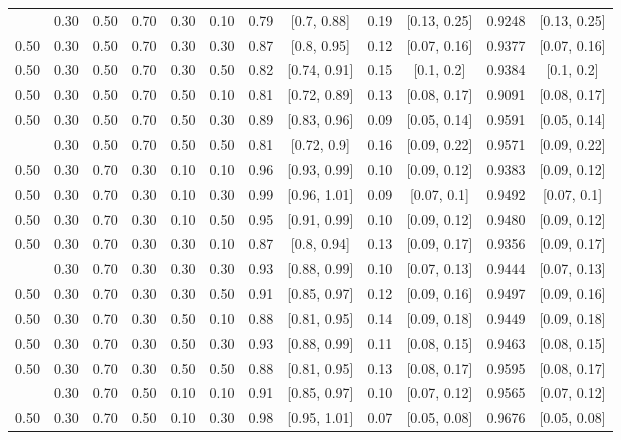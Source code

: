 \documentclass[
  11pt,
]{article}
\begin{document}
\begin{landscape}
\begin{ThreePartTable}
\begin{longtable}[t]{cccccccccccc}
\addlinespace
0.50 & 0.30 & 0.50 & 0.70 & 0.30 & 0.10 & 0.79 & {}[0.7, 0.88] & 0.19 & {}[0.13, 0.25] & 0.9248 & {}[0.13, 0.25]\\
0.50 & 0.30 & 0.50 & 0.70 & 0.30 & 0.30 & 0.87 & {}[0.8, 0.95] & 0.12 & {}[0.07, 0.16] & 0.9377 & {}[0.07, 0.16]\\
0.50 & 0.30 & 0.50 & 0.70 & 0.30 & 0.50 & 0.82 & {}[0.74, 0.91] & 0.15 & {}[0.1, 0.2] & 0.9384 & {}[0.1, 0.2]\\
0.50 & 0.30 & 0.50 & 0.70 & 0.50 & 0.10 & 0.81 & {}[0.72, 0.89] & 0.13 & {}[0.08, 0.17] & 0.9091 & {}[0.08, 0.17]\\
0.50 & 0.30 & 0.50 & 0.70 & 0.50 & 0.30 & 0.89 & {}[0.83, 0.96] & 0.09 & {}[0.05, 0.14] & 0.9591 & {}[0.05, 0.14]\\
\addlinespace
0.50 & 0.30 & 0.50 & 0.70 & 0.50 & 0.50 & 0.81 & {}[0.72, 0.9] & 0.16 & {}[0.09, 0.22] & 0.9571 & {}[0.09, 0.22]\\
0.50 & 0.30 & 0.70 & 0.30 & 0.10 & 0.10 & 0.96 & {}[0.93, 0.99] & 0.10 & {}[0.09, 0.12] & 0.9383 & {}[0.09, 0.12]\\
0.50 & 0.30 & 0.70 & 0.30 & 0.10 & 0.30 & 0.99 & {}[0.96, 1.01] & 0.09 & {}[0.07, 0.1] & 0.9492 & {}[0.07, 0.1]\\
0.50 & 0.30 & 0.70 & 0.30 & 0.10 & 0.50 & 0.95 & {}[0.91, 0.99] & 0.10 & {}[0.09, 0.12] & 0.9480 & {}[0.09, 0.12]\\
0.50 & 0.30 & 0.70 & 0.30 & 0.30 & 0.10 & 0.87 & {}[0.8, 0.94] & 0.13 & {}[0.09, 0.17] & 0.9356 & {}[0.09, 0.17]\\
\addlinespace
0.50 & 0.30 & 0.70 & 0.30 & 0.30 & 0.30 & 0.93 & {}[0.88, 0.99] & 0.10 & {}[0.07, 0.13] & 0.9444 & {}[0.07, 0.13]\\
0.50 & 0.30 & 0.70 & 0.30 & 0.30 & 0.50 & 0.91 & {}[0.85, 0.97] & 0.12 & {}[0.09, 0.16] & 0.9497 & {}[0.09, 0.16]\\
0.50 & 0.30 & 0.70 & 0.30 & 0.50 & 0.10 & 0.88 & {}[0.81, 0.95] & 0.14 & {}[0.09, 0.18] & 0.9449 & {}[0.09, 0.18]\\
0.50 & 0.30 & 0.70 & 0.30 & 0.50 & 0.30 & 0.93 & {}[0.88, 0.99] & 0.11 & {}[0.08, 0.15] & 0.9463 & {}[0.08, 0.15]\\
0.50 & 0.30 & 0.70 & 0.30 & 0.50 & 0.50 & 0.88 & {}[0.81, 0.95] & 0.13 & {}[0.08, 0.17] & 0.9595 & {}[0.08, 0.17]\\
\addlinespace
0.50 & 0.30 & 0.70 & 0.50 & 0.10 & 0.10 & 0.91 & {}[0.85, 0.97] & 0.10 & {}[0.07, 0.12] & 0.9565 & {}[0.07, 0.12]\\
0.50 & 0.30 & 0.70 & 0.50 & 0.10 & 0.30 & 0.98 & {}[0.95, 1.01] & 0.07 & {}[0.05, 0.08] & 0.9676 & {}[0.05, 0.08]\\

\end{longtable}
\end{ThreePartTable}
\end{landscape}
\end{document}
